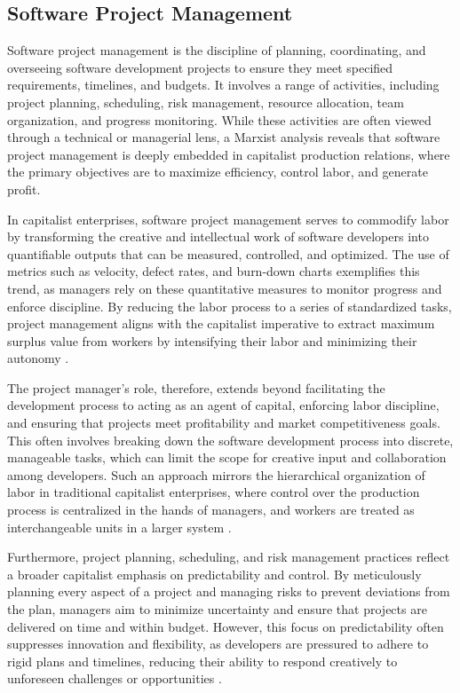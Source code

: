 \begin{refsection}
\section{Software Project Management}

Software project management is the discipline of planning, coordinating, and overseeing software development projects to ensure they meet specified requirements, timelines, and budgets. It involves a range of activities, including project planning, scheduling, risk management, resource allocation, team organization, and progress monitoring. While these activities are often viewed through a technical or managerial lens, a Marxist analysis reveals that software project management is deeply embedded in capitalist production relations, where the primary objectives are to maximize efficiency, control labor, and generate profit.

In capitalist enterprises, software project management serves to commodify labor by transforming the creative and intellectual work of software developers into quantifiable outputs that can be measured, controlled, and optimized. The use of metrics such as velocity, defect rates, and burn-down charts exemplifies this trend, as managers rely on these quantitative measures to monitor progress and enforce discipline. By reducing the labor process to a series of standardized tasks, project management aligns with the capitalist imperative to extract maximum surplus value from workers by intensifying their labor and minimizing their autonomy \cite[pp.~54-57]{Braverman1974Labor}.

The project manager's role, therefore, extends beyond facilitating the development process to acting as an agent of capital, enforcing labor discipline, and ensuring that projects meet profitability and market competitiveness goals. This often involves breaking down the software development process into discrete, manageable tasks, which can limit the scope for creative input and collaboration among developers. Such an approach mirrors the hierarchical organization of labor in traditional capitalist enterprises, where control over the production process is centralized in the hands of managers, and workers are treated as interchangeable units in a larger system \cite[pp.~127-130]{Edwards1980ContestedTerrain}.

Furthermore, project planning, scheduling, and risk management practices reflect a broader capitalist emphasis on predictability and control. By meticulously planning every aspect of a project and managing risks to prevent deviations from the plan, managers aim to minimize uncertainty and ensure that projects are delivered on time and within budget. However, this focus on predictability often suppresses innovation and flexibility, as developers are pressured to adhere to rigid plans and timelines, reducing their ability to respond creatively to unforeseen challenges or opportunities \cite[pp.~41-44]{Hyman1975IndustrialRelations}.


\end{refsection}

